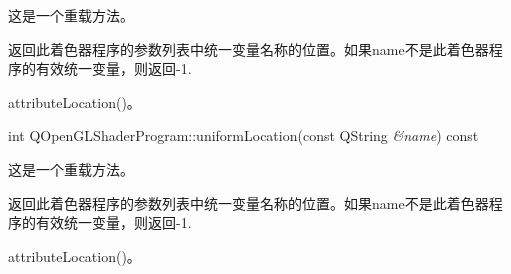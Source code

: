 这是一个重载方法。

返回此着色器程序的参数列表中统一变量名称的位置。如果name不是此着色器程序的有效统一变量，则返回-1.

\begin{seeAlso}
attributeLocation()。
\end{seeAlso}

int QOpenGLShaderProgram::uniformLocation(const QString \emph{\&name}) const

这是一个重载方法。

返回此着色器程序的参数列表中统一变量名称的位置。如果name不是此着色器程序的有效统一变量，则返回-1.

\begin{seeAlso}
attributeLocation()。
\end{seeAlso}